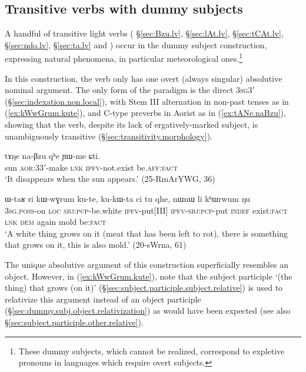 \subsection{Transitive verbs with dummy subjects} \label{sec:transitive.dummy}
A handful of transitive light verbs ( §\ref{sec:Bzu.lv},  §\ref{sec:lAt.lv},  §\ref{sec:tCAt.lv},  §\ref{sec:ndo.lv},  §\ref{sec:ta.lv} and ) occur in the dummy subject construction, expressing natural phenomena, in particular meteorological ones.\footnote{These dummy subjects, which cannot be realized, correspond to expletive pronouns in languages which require overt subjects. }
  
In this construction, the verb only has one overt (always singular) absolutive nominal argument. The only form of the paradigm is the direct \textsc{3sg}\fl{}3$'$ (§\ref{sec:indexation.non.local}), with Stem III alternation in non-past tenses as in (\ref{ex:kWwGrum.kute}), and C-type preverbs in Aorist as in (\ref{ex:tANe.naBzu}), showing that the verb, despite its lack of ergatively-marked subject, is unambiguously transitive (§\ref{sec:transitivity.morphology}). 
 
 
\begin{exe}
\ex \label{ex:tANe.naBzu}
\gll tɤŋe na-βzu qʰe ɲɯ-me ɕti. \\
sun \textsc{aor}:3\fl{}3$'$-make \textsc{lnk} \textsc{ipfv}-not.exist be.\textsc{aff}:\textsc{fact} \\
\glt `It disappears when the sun appears.' (25-RmArYWG, 36)
\end{exe}

\begin{exe}
\ex \label{ex:kWwGrum.kute}
\gll  ɯ-taʁ ri kɯ-wɣrum ku-te, ku-kɯ-ta ci tu qhe, nɯnɯ li kʰɯrwum ŋu \\ 
\textsc{3sg}.\textsc{poss}-on \textsc{loc} \textsc{sbj}:\textsc{pcp}-be.white \textsc{ipfv}-put[III] \textsc{ipfv}-\textsc{sbj}:\textsc{pcp}-put \textsc{indef} exist:\textsc{fact} \textsc{lnk} \textsc{dem} again mold be:\textsc{fact} \\
\glt `A white thing grows on it (meat that has been left to rot), there is something that grows on it, this is also mold.' (20-sWrna, 61)
\end{exe}

The unique absolutive argument of this construction superficially resembles an object. However, in (\ref{ex:kWwGrum.kute}), note that the subject participle  `(the thing) that grows (on it)' (§\ref{sec:subject.participle.subject.relative}) is used to relativize this argument instead of an object participle (§\ref{sec:dummy.subj.object.relativization}) as would have been expected (see also §\ref{sec:subject.participle.other.relative}).

